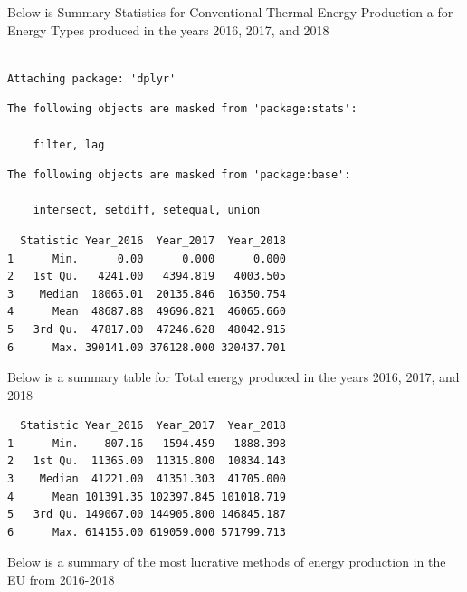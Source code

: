 \documentclass[
  letterpaper,
  DIV=11,
  numbers=noendperiod]{scrartcl}
\begin{document}
Below is Summary Statistics for Conventional Thermal Energy Production a
for Energy Types produced in the years 2016, 2017, and 2018

\begin{verbatim}

Attaching package: 'dplyr'
\end{verbatim}

\begin{verbatim}
The following objects are masked from 'package:stats':

    filter, lag
\end{verbatim}

\begin{verbatim}
The following objects are masked from 'package:base':

    intersect, setdiff, setequal, union
\end{verbatim}

\begin{verbatim}
  Statistic Year_2016  Year_2017  Year_2018
1      Min.      0.00      0.000      0.000
2   1st Qu.   4241.00   4394.819   4003.505
3    Median  18065.01  20135.846  16350.754
4      Mean  48687.88  49696.821  46065.660
5   3rd Qu.  47817.00  47246.628  48042.915
6      Max. 390141.00 376128.000 320437.701
\end{verbatim}

Below is a summary table for Total energy produced in the years 2016,
2017, and 2018

\begin{verbatim}
  Statistic Year_2016  Year_2017  Year_2018
1      Min.    807.16   1594.459   1888.398
2   1st Qu.  11365.00  11315.800  10834.143
3    Median  41221.00  41351.303  41705.000
4      Mean 101391.35 102397.845 101018.719
5   3rd Qu. 149067.00 144905.800 146845.187
6      Max. 614155.00 619059.000 571799.713
\end{verbatim}

Below is a summary of the most lucrative methods of energy production in
the EU from 2016-2018
\end{document}
